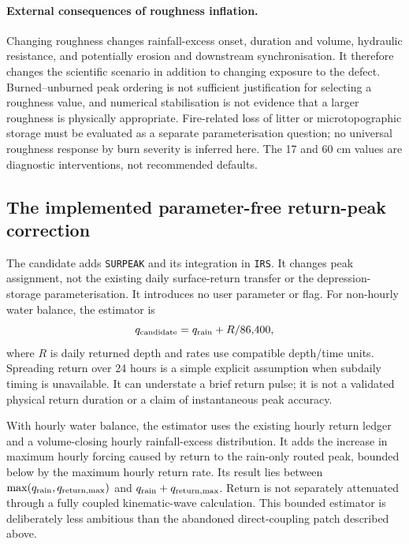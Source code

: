 \paragraph{External consequences of roughness inflation.}
Changing roughness changes rainfall-excess onset, duration and volume,
hydraulic resistance, and potentially erosion and downstream synchronisation.
It therefore changes the scientific scenario in addition to changing exposure
to the defect. Burned--unburned peak ordering is not sufficient justification
for selecting a roughness value, and numerical stabilisation is not evidence
that a larger roughness is physically appropriate. Fire-related loss of litter
or microtopographic storage must be evaluated as a separate parameterisation
question; no universal roughness response by burn severity is inferred here.
The 17 and 60 cm values are diagnostic interventions, not recommended defaults.

\subsection{The implemented parameter-free return-peak correction}

The candidate adds \texttt{SURPEAK} and its integration in \texttt{IRS}. It
changes peak assignment, not the existing daily surface-return transfer or the
depression-storage parameterisation. It introduces no user parameter or flag.
For non-hourly water balance, the estimator is
\begin{equation}
q_{\rm candidate}=q_{\rm rain}+R/86{,}400,
\end{equation}
where $R$ is daily returned depth and rates use compatible depth/time units.
Spreading return over 24 hours is a simple explicit assumption when subdaily
timing is unavailable. It can understate a brief return pulse; it is not a
validated physical return duration or a claim of instantaneous peak accuracy.

With hourly water balance, the estimator uses the existing hourly return
ledger and a volume-closing hourly rainfall-excess distribution. It adds the
increase in maximum hourly forcing caused by return to the rain-only routed
peak, bounded below by the maximum hourly return rate. Its result lies between
$\max(q_{\rm rain},q_{\rm return,max})$ and
$q_{\rm rain}+q_{\rm return,max}$. Return is not separately attenuated through a
fully coupled kinematic-wave calculation. This bounded estimator is deliberately
less ambitious than the abandoned direct-coupling patch described above.

